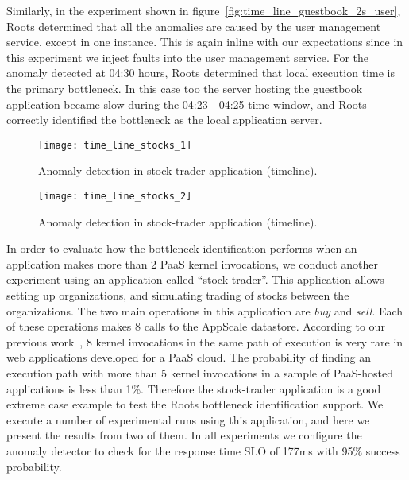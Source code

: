 Similarly, in the experiment shown in figure~\ref{fig:time_line_guestbook_2s_user}, Roots determined
that all the anomalies are caused by the user management service, except in one instance. This is again
inline with our expectations since in this experiment we inject faults into the user management service. For the
anomaly detected at 04:30 hours, Roots determined that local execution time is the primary bottleneck.
In this case too the server hosting the guestbook application became slow
during the 04:23 - 04:25 time window, and Roots correctly identified the bottleneck as the local
application server.

\begin{figure}
\centering
\texttt{[image: time\_line\_stocks\_1]}
\caption{Anomaly detection in stock-trader application (timeline).}
\label{fig:time_line_stocks_1}
\end{figure}

\begin{figure}
\centering
\texttt{[image: time\_line\_stocks\_2]}
\caption{Anomaly detection in stock-trader application (timeline).}
\label{fig:time_line_stocks_2}
\end{figure}

In order to evaluate how the bottleneck identification performs when an application makes more than 2
PaaS kernel invocations, we conduct another experiment using an application called ``stock-trader''.
This application allows setting up organizations, and simulating trading of stocks between the
organizations. The two main operations in this application are \textit{buy} and \textit{sell}. Each of
these operations makes 8 calls to the AppScale datastore. 
According to our previous work~\cite{Jayathilaka:2015:RTS:2806777.2806842}, 8 kernel invocations in the
same path of execution is very rare in web applications developed for a PaaS cloud. The probability
of finding an execution path with more than 5 kernel invocations in a sample of PaaS-hosted
applications is less than 1\%. Therefore the stock-trader application is a good extreme case
example to test the Roots bottleneck identification support.
We execute a number of experimental runs using this application,
and here we present the results from two of them. In all experiments we configure the anomaly
detector to check for the response time SLO of 177ms with 95\% success probability.

